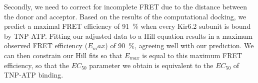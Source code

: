Secondly, we need to correct for incomplete FRET due to the distance between the donor and acceptor.
Based on the results of the computational docking, we predict a maximal FRET efficiency of \SI{91}{\percent} when every Kir6.2 subunit is bound by TNP-ATP.
Fitting our adjusted data to a Hill equation results in a maximum observed FRET efficiency ($E_max$) of \SI{90}{\percent}, agreeing well with our prediction.
We can then constrain our Hill fits so that $E_{max}$ is equal to this maximum FRET efficiency, so that the $EC_{50}$ parameter we obtain is equivalent to the $EC_{50}$ of TNP-ATP binding.

\begin{figure}[h]
	\centering
	\begin{minipage}{0.35\textwidth}
	\begin{subfigure}[t]{\textwidth}
		\caption{}\label{ch3fig:exifret_program}
		\centering

\end{subfigure}
\end{minipage}
\end{figure}
